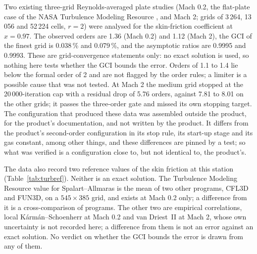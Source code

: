 \documentclass[11pt,a4paper]{article}
\begin{document}
Two existing three-grid Reynolds-averaged plate studies (Mach 0.2, the flat-plate case of the NASA Turbulence
Modeling Resource \citep{tmr}, and Mach 2; grids of 3\,264, 13\,056 and
52\,224 cells, $r=2$) were analysed for the skin-friction coefficient at $x=0.97$.
The observed orders are 1.36 (Mach 0.2) and 1.12 (Mach 2), the GCI of the finest grid is 0.038\,\% and 0.079\,\%,
and the asymptotic ratios are 0.9995 and 0.9993.
These are grid-convergence statements only: no exact solution is used, so nothing here tests whether the GCI
bounds the error.
Orders of 1.1 to 1.4 lie below the formal order of 2 and are not flagged by the order rules; a limiter is a
possible cause that was not tested.
At Mach 2 the medium grid stopped at the 20\,000-iteration cap with a residual drop of 5.76 orders, against 7.81 to
8.01 on the other grids; it passes the three-order gate and missed its own stopping target.
The configuration that produced these data was assembled outside the product, for the product's documentation, and not
written by the product.
It differs from the product's second-order configuration in its stop rule, its start-up stage and its gas constant,
among other things, and these differences are pinned by a test;
so what was verified is a configuration close to, but not identical to, the product's.

The data also record two reference values of the skin friction at this station (Table~\ref{tab:turbref}).
Neither is an exact solution.
The Turbulence Modeling Resource value for Spalart--Allmaras is the mean of two other programs, CFL3D and FUN3D, on a $545\times385$ grid, and exists at Mach 0.2 only; a difference from it is a cross-comparison of programs.
The other two are empirical correlations, local K\'arm\'an--Schoenherr at Mach 0.2 and van Driest~II at Mach 2, whose own uncertainty is not recorded here; a difference from them is not an error against an exact solution.
No verdict on whether the GCI bounds the error is drawn from any of them.
\end{document}
